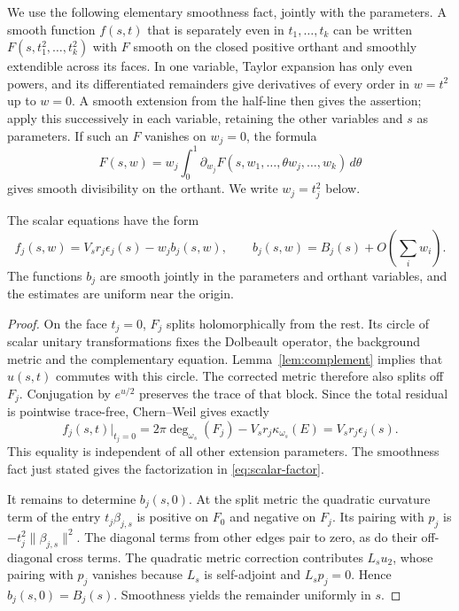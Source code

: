 We use the following elementary smoothness fact, jointly with the
parameters. A smooth function $f(s,t)$ that is separately even in
$t_1,\ldots,t_k$ can be written $F(s,t_1^2,\ldots,t_k^2)$ with
$F$ smooth on the closed positive orthant and smoothly extendible
across its faces. In one variable, Taylor expansion has only even
powers, and its differentiated remainders give derivatives of every
order in $w=t^2$ up to $w=0$. A smooth extension from the half-line
then gives the assertion; apply this successively in each variable,
retaining the other variables and $s$ as parameters. If such an $F$
vanishes on $w_j=0$, the formula
\[
 F(s,w)=w_j\int_0^1\partial_{w_j}F(s,w_1,\ldots,\theta w_j,
                                      \ldots,w_k)\,d\theta
\]
gives smooth divisibility on the orthant. We write $w_j=t_j^2$ below.

\begin{proposition}\label{prop:face}
The scalar equations have the form
\begin{equation}\label{eq:scalar-factor}
 f_j(s,w)=V_sr_j\epsilon_j(s)-w_jb_j(s,w),\qquad
 b_j(s,w)=B_j(s)+O\left(\sum_iw_i\right).
\end{equation}
The functions $b_j$ are smooth jointly in the parameters and orthant
variables, and the estimates are uniform near the origin.
\end{proposition}

\begin{proof}
On the face $t_j=0$, $F_j$ splits holomorphically from the rest.
Its circle of scalar unitary transformations fixes the Dolbeault
operator, the background metric and the complementary equation.
Lemma~\ref{lem:complement} implies that $u(s,t)$ commutes with
this circle. The corrected metric therefore also splits off $F_j$.
Conjugation by $e^{u/2}$ preserves the trace of that block. Since
the total residual is pointwise trace-free, Chern--Weil gives exactly
\begin{equation}\label{eq:face-identity}
 f_j(s,t)\big|_{t_j=0}
 =2\pi\deg_{\omega_s}(F_j)-V_sr_j\kappa_{\omega_s}(E)
 =V_sr_j\epsilon_j(s).
\end{equation}
This equality is independent of all other extension parameters.
The smoothness fact just stated gives the factorization in
\eqref{eq:scalar-factor}.

It remains to determine $b_j(s,0)$. At the split metric the quadratic
curvature term of the entry $t_j\beta_{j,s}$ is positive on $F_0$
and negative on $F_j$. Its pairing with $p_j$ is
$-t_j^2\|\beta_{j,s}\|^2$. The diagonal terms from other edges pair
to zero, as do their off-diagonal cross terms. The quadratic metric
correction contributes $L_su_2$, whose pairing with $p_j$ vanishes
because $L_s$ is self-adjoint and $L_sp_j=0$. Hence
$b_j(s,0)=B_j(s)$. Smoothness yields the remainder uniformly in $s$.
\end{proof}

